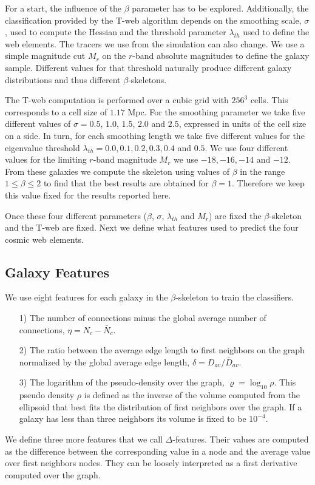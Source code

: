 \documentclass[usenatbib]{mnras}
\begin{document}
For a start, the influence of the $\beta$ parameter has to be explored.
Additionally, the classification provided by the T-web algorithm
depends on the smoothing scale, $\sigma$, used to compute the Hessian and the
threshold parameter $\lambda_{th}$ used to define the web elements.
The tracers we use from the simulation can also change. 
We use a simple magnitude cut $M_{r}$ on the $r$-band absolute magnitudes
to define the galaxy sample. 
Different values for that threshold naturally produce different galaxy
distributions and thus different $\beta$-skeletons. 

The T-web computation is performed over a cubic grid with $256^3$
cells.  
This corresponds to a cell size of $1.17$ Mpc.
For the smoothing parameter we take five different values of $\sigma =
0.5$, $1.0$, $1.5$, $2.0$ and $2.5$, expressed in units of the cell
size on a side.   
In turn, for each smoothing length we take five different values for
the eigenvalue threshold
$\lambda_{th}=0.0, 0.1, 0.2, 0.3, 0.4$ and $0.5$. 
We use four different values for the limiting $r$-band magnitude
$M_{r}$ we use  $-18, -16, -14$ and $-12$.
From these galaxies we compute the skeleton using values of $\beta$ in
the range $1\leq \beta \leq 2$ to find that the best results are
obtained for $\beta=1$.   
Therefore we keep this value fixed for the results reported here.

Once these four different parameters ($\beta$,
$\sigma$, $\lambda_{th}$ and $M_{r}$) are fixed the $\beta$-skeleton and the
T-web are fixed.  
Next we define what features used to predict the four cosmic web elements.

\subsection{Galaxy Features}
We use eight features for each galaxy in the $\beta$-skeleton to train the classifiers. 

\begin{enumerate}
\item[1)]
The number of connections minus the global average number of
connections, $\eta = N_c - \bar{N}_c$. 
\item[2)]
The ratio between the average edge length to first neighbors on the graph
normalized by the global average edge length, $\delta=D_{av}/\bar{D}_{av}$. 
\item[3)] 
The logarithm of the pseudo-density over the graph,
  $\varrho=\log_{10}\rho$.   
This pseudo density $\rho$ is defined as the inverse of the volume
computed from the ellipsoid that best fits the distribution of first
neighbors over the graph. 
If a galaxy has less than three neighbors its volume is fixed to be $10^{-4}$.
\end{enumerate}
\noindent
We define three more features that we call $\Delta$-features.
Their values are computed as the difference between the corresponding
value in a node and the average value over first neighbors nodes.  
They can be loosely interpreted as a first derivative computed over the graph. 
\end{document}
